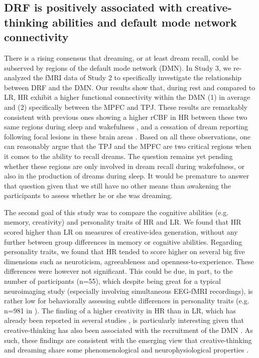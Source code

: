 \subsection{DRF is positively associated with creative-thinking abilities and default mode network connectivity}
\label{disc:drf:summary:dmn}

There is a rising consensus that dreaming, or at least dream recall, could be subserved by regions of the default mode network (DMN). In Study 3, we re-analyzed the fMRI data of Study 2 to specifically investigate the relationship between DRF and the DMN. Our results show that, during rest and compared to LR, HR exhibit a higher functional connectivity within the DMN (1) in average and (2) specifically between the MPFC and TPJ. These results are remarkably consistent with previous ones showing a higher rCBF in HR between these two same regions during sleep and wakefulness \citep{eichenlaub_resting_2014}, and a cessation of dream reporting following focal lesions in these brain areas \citep{solms_neuropsychology_1997}. Based on all these observations, one can reasonably argue that the TPJ and the MPFC are two critical regions when it comes to the ability to recall dreams. The question remains yet pending whether these regions are only involved in dream recall during wakefulness, or also in the production of dreams during sleep. It would be premature to answer that question given that we still have no other means than awakening the participants to assess whether he or she was dreaming.

The second goal of this study was to compare the cognitive abilities (e.g. memory, creativity) and personality traits of HR and LR. We found that HR scored higher than LR on measures of creative-idea generation, without any further between group differences in memory or cognitive abilities. Regarding personality traits, we found that HR tended to score higher on several big five dimensions such as neuroticism, agreeableness and openness-to-experience. These differences were however not significant. This could be due, in part, to the number of participants (n=55), which despite being great for a typical neuroimaging study (especially involving simultaneous EEG-fMRI recordings), is rather low for behaviorally assessing subtle differences in personality traits (e.g. n=981 in \citealp{hartmann_boundaries_1989}). The finding of a higher creativity in HR than in LR, which has already been reported in several studies \citep{fitch_variations_1989, schredl_creativity_1995, schredl_factors_2003}, is particularly interesting given that creative-thinking has also been associated with the recruitment of the DMN \citep{ellamil_evaluative_2012, jung_structure_2013, beaty_creativity_2014, mok_interplay_2014, beaty_default_2015, christoff_mind-wandering_2016}. As such, these findings are consistent with the emerging view that creative-thinking and dreaming share some phenomenological and neurophysiological properties \citep{christoff_mind-wandering_2016}.


